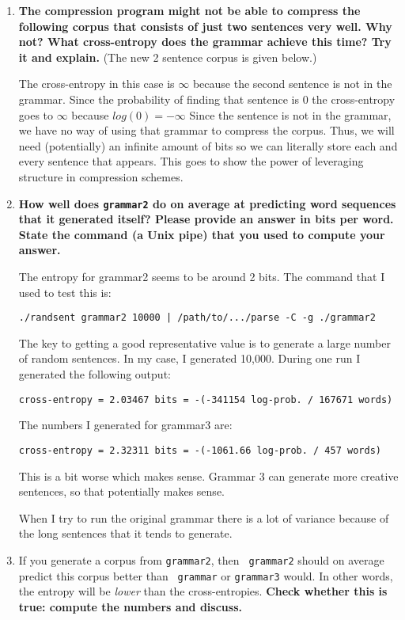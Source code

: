 \documentclass[10pt]{article}
\begin{document}
\begin{enumerate}
\begin{enumerate}
\begin{enumerate}
\item {\bf The compression program might not be able to compress the
    following corpus that consists of just two sentences very well.
    Why not? What cross-entropy does the grammar achieve this time?
    Try it and explain.}  (The new 2 sentence corpus is given below.)

The cross-entropy in this case is $\infty$ because the second sentence is not in the grammar. Since the probability of finding that sentence is 0 the cross-entropy goes to $\infty$ because $log(0) = - \infty$ Since the sentence is not in the grammar, we have no way of using that grammar to compress the corpus. Thus, we will need (potentially) an infinite amount of bits so we can literally store each and every sentence that appears. This goes to show the power of leveraging structure in compression schemes. 

\item {\bf How well does {\tt grammar2} do on average at predicting
    word sequences that it generated itself?  Please provide an answer
    in bits per word.  State the command (a Unix pipe) that you used
    to compute your answer.}

The entropy for grammar2 seems to be around 2 bits. The command that I used to test this is:

{\tt ./randsent grammar2 10000 | /path/to/.../parse -C -g ./grammar2 }

The key to getting a good representative value is to generate a large number of random sentences. In my case, I generated 10,000. During one run I generated the following output:

{\tt cross-entropy = 2.03467 bits = -(-341154 log-prob. / 167671 words)}
 

The numbers I generated for grammar3 are:

{\tt cross-entropy = 2.32311 bits = -(-1061.66 log-prob. / 457 words)}

This is a bit worse which makes sense. Grammar 3 can generate more creative sentences, so that potentially makes sense.

When I try to run the original grammar there is a lot of variance because of the long sentences that it tends to generate.

\item If you generate a corpus from {\tt grammar2}, then {\tt
    grammar2} should on average predict this corpus better than {\tt
    grammar} or {\tt grammar3} would. In other words, the entropy will
  be {\it lower} than the cross-entropies. {\bf Check whether this is true:
    compute the numbers and discuss.} 



\end{enumerate}
\end{enumerate}
\end{enumerate}
\end{document}
